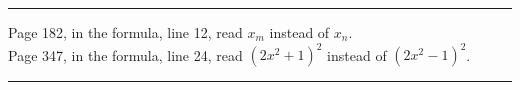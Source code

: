 \begin{center}

\medskip
\rule{1.5cm}{0.4pt}
\end{center}

Page 182, in the formula, line 12, read $x_m$ instead of $x_n$.\\
Page 347, in the formula, line 24, read $(2x^2+1)^2$ instead of $(2x^2-1)^2$.

\begin{center}
\medskip
\rule{4cm}{0.4pt}
\end{center}
